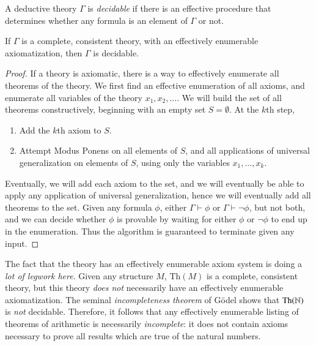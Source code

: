 A deductive theory $\Gamma$ is \emph{decidable} if there is an effective procedure that determines whether any formula is an element of $\Gamma$ or not.

\begin{theorem}
    If $\Gamma$ is a complete, consistent theory, with an effectively enumerable axiomatization, then $\Gamma$ is decidable.
\end{theorem}
\begin{proof}
    If a theory is axiomatic, there is a way to effectively enumerate all theorems of the theory. We first find an effective enumeration of all axioms, and enumerate all variables of the theory $x_1, x_2, \dots$. We will build the set of all theorems constructively, beginning with an empty set $S = \emptyset$. At the $k$th step,
    \begin{enumerate}
        \item Add the $k$th axiom to $S$.
        \item Attempt Modus Ponens on all elements of $S$, and all applications of universal generalization on elements of $S$, using only the variables $x_1, \dots, x_k$.
    \end{enumerate}
    Eventually, we will add each axiom to the set, and we will eventually be able to apply any application of universal generalization, hence we will eventually add all theorems to the set. Given any formula $\phi$, either $\Gamma \vdash \phi$ or $\Gamma \vdash \neg \phi$, but not both, and we can decide whether $\phi$ is provable by waiting for either $\phi$ or $\neg \phi$ to end up in the enumeration. Thus the algorithm is guaranteed to terminate given any input.
\end{proof}

The fact that the theory has an effectively enumerable axiom system is doing a \emph{lot of legwork here}. Given any structure $M$, $\text{Th}(M)$ is a complete, consistent theory, but this theory \emph{does not} necessarily have an effectively enumerable axiomatization. The seminal \emph{incompleteness theorem} of G\"{o}del shows that $\text{Th}(\operatorname{\mathbb{N}})$ is \emph{not} decidable. Therefore, it follows that any effectively enumerable listing of theorems of arithmetic is necessarily \emph{incomplete}: it does not contain axioms necessary to prove all results which are true of the natural numbers.

